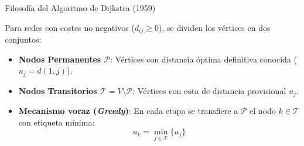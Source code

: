 \documentclass[
  ignorenonframetext,
]{beamer}
\providecommand{\tightlist}{%
  \setlength{\itemsep}{0pt}\setlength{\parskip}{0pt}}
\begin{document}
\begin{frame}{Filosofía del Algoritmo de Dijkstra (1959)}
\label{filosofuxeda-del-algoritmo-de-dijkstra-1959}
\begin{tcolorbox}[enhanced jigsaw, colframe=quarto-callout-note-color-frame, toptitle=1mm, colback=white, colbacktitle=quarto-callout-note-color!10!white, titlerule=0mm, breakable, coltitle=black, opacityback=0, bottomrule=.15mm, title=\textcolor{quarto-callout-note-color}{\faInfo}\hspace{0.5em}{Estrategia voraz de etiquetado permanente}, rightrule=.15mm, arc=.35mm, leftrule=.75mm, left=2mm, toprule=.15mm, bottomtitle=1mm, opacitybacktitle=0.6]

Para redes con costes no negativos (\(d_{ij} \ge 0\)), se dividen los
vértices en dos conjuntos:

\begin{itemize}
\tightlist
\item
  \textbf{Nodos Permanentes \(\mathcal{P}\)}: Vértices con distancia
  óptima definitiva conocida (\(u_j = d(1, j)\)).
\item
  \textbf{Nodos Transitorios \(\mathcal{T} = V \setminus \mathcal{P}\)}:
  Vértices con cota de distancia provisional \(u_j\).
\end{itemize}

\end{tcolorbox}

\begin{itemize}
\tightlist
\item
  \textbf{Mecanismo voraz (\emph{Greedy})}: En cada etapa se transfiere
  a \(\mathcal{P}\) el nodo \(k \in \mathcal{T}\) con etiqueta mínima:
  \[u_k = \min_{j \in \mathcal{T}} \{ u_j \}\]
\end{itemize}
\end{frame}
\end{document}
